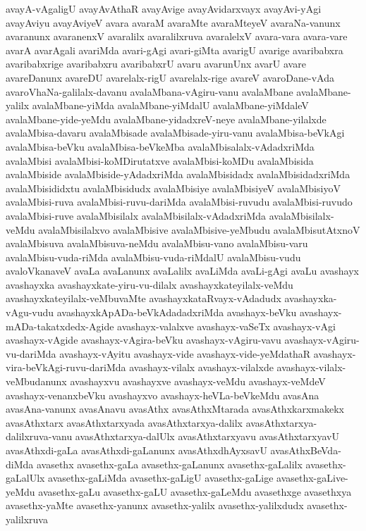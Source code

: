 {avayA-vAgaligU
avayAvAthaR
avayAvige
avayAvidarxvayx
avayAvi-yAgi
avayAviyu
avayAviyeV
avara
avaraM
avaraMte
avaraMteyeV
avaraNa-vanunx
avaranunx
avaranenxV
avaralilx
avaralilxruva
avaralelxV
avara-vara
avara-vare
avarA
avarAgali
avariMda
avari-gAgi
avari-giMta
avarigU
avarige
avaribabxra
avaribabxrige
avaribabxru
avaribabxrU
avaru
avarunUnx
avarU
avare
avareDanunx
avareDU
avarelalx-rigU
avarelalx-rige
avareV
avaroDane-vAda
avaroVhaNa-galilalx-davanu
avalaMbana-vAgiru-vanu
avalaMbane
avalaMbane-yalilx
avalaMbane-yiMda
avalaMbane-yiMdalU
avalaMbane-yiMdaleV
avalaMbane-yide-yeMdu
avalaMbane-yidadxreV-neye
avalaMbane-yilalxde
avalaMbisa-davaru
avalaMbisade
avalaMbisade-yiru-vanu
avalaMbisa-beVkAgi
avalaMbisa-beVku
avalaMbisa-beVkeMba
avalaMbisalalx-vAdadxriMda
avalaMbisi
avalaMbisi-koMDirutatxve
avalaMbisi-koMDu
avalaMbisida
avalaMbiside
avalaMbiside-yAdadxriMda
avalaMbisidadx
avalaMbisidadxriMda
avalaMbisididxtu
avalaMbisidudx
avalaMbisiye
avalaMbisiyeV
avalaMbisiyoV
avalaMbisi-ruva
avalaMbisi-ruvu-dariMda
avalaMbisi-ruvudu
avalaMbisi-ruvudo
avalaMbisi-ruve
avalaMbisilalx
avalaMbisilalx-vAdadxriMda
avalaMbisilalx-veMdu
avalaMbisilalxvo
avalaMbisive
avalaMbisive-yeMbudu
avalaMbisutAtxnoV
avalaMbisuva
avalaMbisuva-neMdu
avalaMbisu-vano
avalaMbisu-varu
avalaMbisu-vuda-riMda
avalaMbisu-vuda-riMdalU
avalaMbisu-vudu
avaloVkanaveV
avaLa
avaLanunx
avaLalilx
avaLiMda
avaLi-gAgi
avaLu
avashayx
avashayxka
avashayxkate-yiru-vu-dilalx
avashayxkateyilalx-veMdu
avashayxkateyilalx-veMbuvaMte
avashayxkataRvayx-vAdadudx
avashayxka-vAgu-vudu
avashayxkApADa-beVkAdadadxriMda
avashayx-beVku
avashayx-mADa-takatxdedx-Agide
avashayx-valalxve
avashayx-vaSeTx
avashayx-vAgi
avashayx-vAgide
avashayx-vAgira-beVku
avashayx-vAgiru-vavu
avashayx-vAgiru-vu-dariMda
avashayx-vAyitu
avashayx-vide
avashayx-vide-yeMdathaR
avashayx-vira-beVkAgi-ruvu-dariMda
avashayx-vilalx
avashayx-vilalxde
avashayx-vilalx-veMbudanunx
avashayxvu
avashayxve
avashayx-veMdu
avashayx-veMdeV
avashayx-venanxbeVku
avashayxvo
avashayx-heVLa-beVkeMdu
avasAna
avasAna-vanunx
avasAnavu
avasAthx
avasAthxMtarada
avasAthxkarxmakekx
avasAthxtarx
avasAthxtarxyada
avasAthxtarxya-dalilx
avasAthxtarxya-dalilxruva-vanu
avasAthxtarxya-dalUlx
avasAthxtarxyavu
avasAthxtarxyavU
avasAthxdi-gaLa
avasAthxdi-gaLanunx
avasAthxdhAyxsavU
avasAthxBeVda-diMda
avasethx
avasethx-gaLa
avasethx-gaLanunx
avasethx-gaLalilx
avasethx-gaLalUlx
avasethx-gaLiMda
avasethx-gaLigU
avasethx-gaLige
avasethx-gaLive-yeMdu
avasethx-gaLu
avasethx-gaLU
avasethx-gaLeMdu
avasethxge
avasethxya
avasethx-yaMte
avasethx-yanunx
avasethx-yalilx
avasethx-yalilxdudx
avasethx-yalilxruva
}
